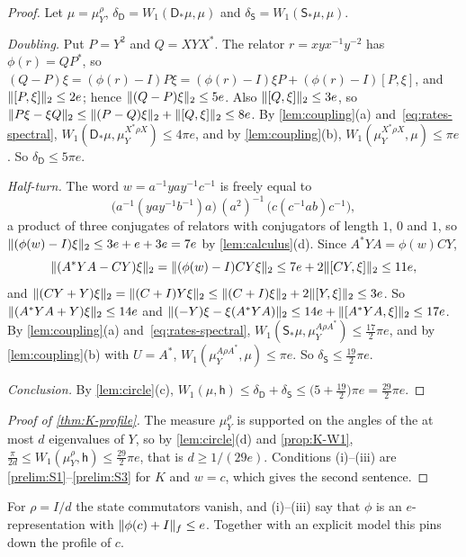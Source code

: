 \begin{proof}
Let $\mu=\mu^\rho_Y$, $\delta_{\mathsf D}=W_1(\mathsf D_*\mu,\mu)$ and $\delta_{\mathsf S}=W_1(\mathsf S_*\mu,\mu)$.

\emph{Doubling.} Put $P=Y^2$ and $Q=XYX^*$. The relator $r=xyx^{-1}y^{-2}$ has $\phi(r)=QP^*$, so $(Q-P)\xi=(\phi(r)-I)P\xi=(\phi(r)-I)\xi
P+(\phi(r)-I)[P,\xi]$, and $\lVert [P,\xi]\rVert_2\le2e$; hence $\lVert (Q-P)\xi\rVert_2\le5e$. Also $\lVert [Q,\xi]\rVert_2\le3e$, so $\lVert P\xi-\xi Q\rVert_2\le\lVert (P-Q)\xi\rVert_2+\lVert [Q,\xi]\rVert_2\le8e$.
By \cref{lem:coupling}(a) and~\eqref{eq:rates-spectral}, $W_1(\mathsf D_*\mu,\mu^{X^*\rho X}_Y)\le4\pi e$, and by \cref{lem:coupling}(b),
$W_1(\mu^{X^*\rho X}_Y,\mu)\le\pi e$. So $\delta_{\mathsf D}\le5\pi e$.

\emph{Half-turn.} The word $w=a^{-1}yay^{-1}c^{-1}$ is freely equal to
\[
\bigl(a^{-1}(yay^{-1}b^{-1})a\bigr)\,(a^2)^{-1}\,\bigl(c(c^{-1}ab)c^{-1}\bigr),
\]
a product of three conjugates of relators with conjugators of length $1$, $0$ and $1$, so $\lVert (\phi(w)-I)\xi\rVert_2\le3e+e+3e=7e$ by
\cref{lem:calculus}(d). Since $A^*YA=\phi(w)CY$,
\[
\lVert (A^*YA-CY)\xi\rVert_2=\lVert (\phi(w)-I)CY\xi\rVert_2\le7e+2\lVert [CY,\xi]\rVert_2\le11e,
\]
and $\lVert (CY+Y)\xi\rVert_2=\lVert (C+I)Y\xi\rVert_2\le\lVert (C+I)\xi\rVert_2+2\lVert [Y,\xi]\rVert_2\le3e$. So $\lVert (A^*YA+Y)\xi\rVert_2\le14e$ and
$\lVert (-Y)\xi-\xi(A^*YA)\rVert_2\le14e+\lVert [A^*YA,\xi]\rVert_2\le17e$. By \cref{lem:coupling}(a) and~\eqref{eq:rates-spectral},
$W_1(\mathsf S_*\mu,\mu^{A\rho A^*}_Y)\le\frac{17}2\pi e$, and by \cref{lem:coupling}(b) with $U=A^*$, $W_1(\mu^{A\rho A^*}_Y,\mu)\le\pi e$.
So $\delta_{\mathsf S}\le\frac{19}2\pi e$.

\emph{Conclusion.} By \cref{lem:circle}(c), $W_1(\mu,\mathsf h)\le\delta_{\mathsf D}+\delta_{\mathsf S}\le\bigl(5+\frac{19}2\bigr)\pi
e=\frac{29}2\pi e$.
\end{proof}

\begin{proof}[Proof of \cref{thm:K-profile}]
The measure $\mu^\rho_Y$ is supported on the angles of the at most $d$ eigenvalues of $Y$, so by \cref{lem:circle}(d) and
\cref{prop:K-W1}, $\frac\pi{2d}\le W_1(\mu^\rho_Y,\mathsf h)\le\frac{29}2\pi e$, that is $d\ge1/(29e)$. Conditions (i)--(iii) are
\ref{prelim:S1}--\ref{prelim:S3} for $K$ and $w=c$, which gives the second sentence.
\end{proof}

For $\rho=I/d$ the state commutators vanish, and (i)--(iii) say that $\phi$ is an $e$-representation with $\lVert \phi(c)+I\rVert_f\le e$. Together
with an explicit model this pins down the profile of $c$.

